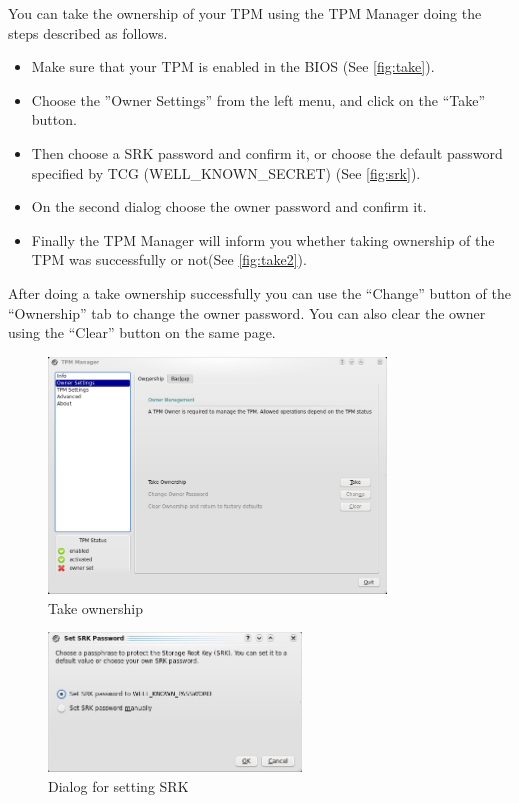 \documentclass[
  american        %
]{sirrixreport}
\begin{document}
You can take the ownership of your TPM using the TPM Manager doing the steps described as follows.
\begin{itemize}
   \item Make sure that your TPM is enabled in the BIOS (See \autoref{fig:take}).
   \item Choose the ''Owner Settings'' from the left menu, and click on the ``Take'' button.
   \item Then choose a SRK password and confirm it, or choose the default password specified by TCG (WELL\_KNOWN\_SECRET) (See \autoref{fig:srk}).
   \item On the second dialog choose the owner password and confirm it. 
   \item Finally the TPM Manager will inform you whether taking ownership of the TPM was successfully or not(See \autoref{fig:take2}).
\end{itemize}
After doing a take ownership successfully you can use the ``Change'' button of the ``Ownership'' tab to change the owner password. You can also clear the owner using the ``Clear'' button on the same page.
\begin{figure}[h]
 \centering
   \includegraphics[width=0.8\textwidth]{images/tpmmanager_noowner.jpg}
   \caption{Take ownership}
\label{fig:take}
\end{figure}
\begin{figure}[h]
 \centering
   \includegraphics[width=0.6\textwidth]{images/tpmmanager_take_srk.jpg}
   \caption{Dialog for setting SRK}
\label{fig:srk}
\end{figure}
\end{document}
